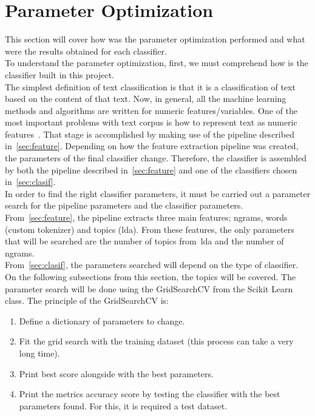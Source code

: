 \section{Parameter Optimization}
This section will cover how was the parameter optimization performed and what were the results obtained for each classifier.\\
To understand the parameter optimization, first, we must comprehend how is the classifier built in this project.\\
The simplest definition of text classification is that it is a classification of text based on the content of that text. Now, in general, all the machine learning methods and algorithms are written for numeric features/variables. One of the most important problems with text corpus is how to represent text as numeric features~\cite{lr}. That stage is accomplished by making use of the pipeline described in~\cref{sec:feature}. Depending on how the feature extraction pipeline was created, the parameters of the final classifier change. Therefore, the classifier is assembled by both the pipeline described in~\cref{sec:feature} and one of the classifiers chosen in~\cref{sec:clasif}.\\
In order to find the right classifier parameters, it must be carried out a parameter search for the pipeline parameters and the classifier parameters.\\
From~\cref{sec:feature}, the pipeline extracts three main features; ngrams, words (custom tokenizer) and topics (\ac{lda}). From these features, the only parameters that will be searched are the number of topics from~\ac{lda} and the number of ngrams.\\
From~\cref{sec:clasif}, the parameters searched will depend on the type of classifier. On the following subsections from this section, the topics will be covered.
The parameter search will be done using the GridSearchCV from the Scikit Learn class. The principle of the GridSearchCV is:
\begin{enumerate}
	\item Define a dictionary of parameters to change.
	\item Fit the grid search with the training dataset (this process can take a very long time).
	\item Print best score alongside with the best parameters.
	\item Print the metrics accuracy score by testing the classifier with the best parameters found. For this, it is required a test dataset.
\end{enumerate}
